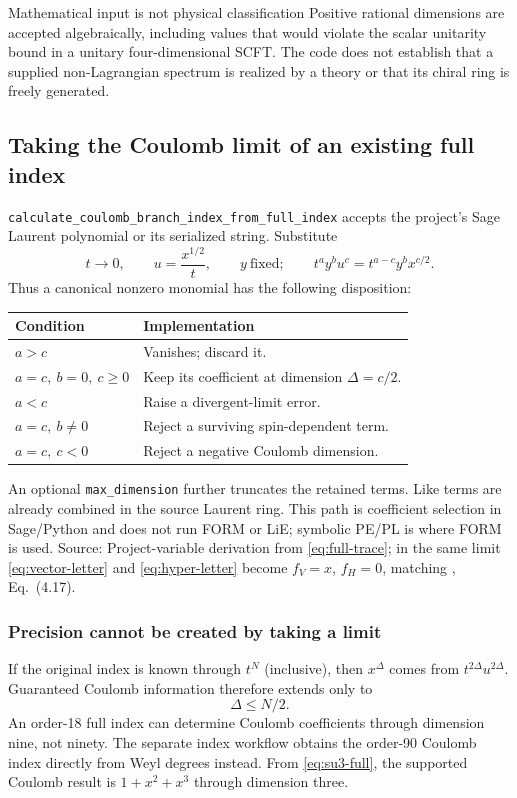 \documentclass[11pt,a4paper]{article}
\numberwithin{equation}{section}
\newcommand{\code}[1]{{\small\nolinkurl{#1}}}
\newcommand{\src}[1]{{\small\color{muted}Source: #1.}\par}
\begin{document}
\begin{note}{Mathematical input is not physical classification}
Positive rational dimensions are accepted algebraically, including values that
would violate the scalar unitarity bound in a unitary four-dimensional SCFT.
The code does not establish that a supplied non-Lagrangian spectrum is realized
by a theory or that its chiral ring is freely generated.
\end{note}

\clearpage
\subsection{Taking the Coulomb limit of an existing full index}
\code{calculate_coulomb_branch_index_from_full_index} accepts the project's Sage
Laurent polynomial or its serialized string. Substitute
\begin{equation}
 t\longrightarrow0,\qquad u=\frac{x^{1/2}}t,\qquad y\ \text{fixed};
 \qquad t^ay^bu^c=t^{a-c}y^b x^{c/2}.
 \label{eq:cb-limit}
\end{equation}
Thus a canonical nonzero monomial has the following disposition:
\begin{tabularx}{\textwidth}{@{}p{47mm}Y@{}}
\toprule Condition & Implementation\\\midrule
$a>c$ & Vanishes; discard it.\\
$a=c,\ b=0,\ c\geq0$ & Keep its coefficient at dimension $\Delta=c/2$.\\
$a<c$ & Raise a divergent-limit error.\\
$a=c,\ b\ne0$ & Reject a surviving spin-dependent term.\\
$a=c,\ c<0$ & Reject a negative Coulomb dimension.\\\bottomrule
\end{tabularx}
An optional \code{max_dimension} further truncates the retained terms. Like
terms are already combined in the source Laurent ring. This path is coefficient
selection in Sage/Python and does not run FORM or LiE; symbolic PE/PL is where
FORM is used.
\src{Project-variable derivation from \eqref{eq:full-trace}; in the same limit
\eqref{eq:vector-letter} and \eqref{eq:hyper-letter} become $f_V=x$, $f_H=0$,
matching \cite{grry}, Eq.~(4.17)}

\subsubsection{Precision cannot be created by taking a limit}
If the original index is known through $t^N$ (inclusive), then $x^\Delta$ comes
from $t^{2\Delta}u^{2\Delta}$. Guaranteed Coulomb information therefore extends
only to
\begin{equation}
 \Delta\leq N/2.
 \label{eq:cb-precision}
\end{equation}
An order-18 full index can determine Coulomb coefficients through dimension
nine, not ninety. The separate index workflow obtains the order-90 Coulomb index
directly from Weyl degrees instead. From \eqref{eq:su3-full}, the supported
Coulomb result is $1+x^2+x^3$ through dimension three.
\end{document}

